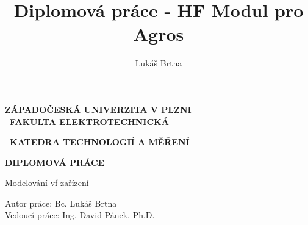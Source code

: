 \documentclass[12pt,a4paper,oneside]{article}
\author{Lukáš Brtna}
\title{Diplomová práce - HF Modul pro Agros}
\numberwithin{equation}{section} %
\numberwithin{figure}{section} %
\numberwithin{table}{section} %
\newcommand{\tg}{\mathrm{tg}\ }
\newcommand{\grad}{\mathrm{grad}\ }
\newcommand{\rot}{\mathrm{rot}\ }
\renewcommand{\div}{\mathrm{div}\ }
\begin{document}
\renewcommand\refname{Použitá literatura} %
\newcommand{\cotg}{\mathop{\rm cotg}\nolimits} %
\newcommand{\udiv}{\mathop{\rm div}\nolimits} %
\newcommand{\ud}{\mathrm{d}} %



\pagestyle{empty} %


\begin{titlepage} 
\begin{center}

\begin{large}
\textbf{ZÁPADOČESKÁ UNIVERZITA V PLZNI\\
~FAKULTA ELEKTROTECHNICKÁ\\
\vspace*{5mm}}
\end{large}
\textbf{~KATEDRA TECHNOLOGIÍ A MĚŘENÍ}
\vspace{70mm}\\

\begin{Huge}
\textbf{DIPLOMOVÁ PRÁCE}
\vspace{8mm}\\
\end{Huge}
\begin{LARGE}
Modelování vf zařízení \vspace{90mm}\\
\end{LARGE}
\end{center}

\begin{flushleft}
\begin{large}
Autor práce: Bc. Lukáš Brtna\\
\vspace{3mm}
Vedoucí práce: Ing. David Pánek, Ph.D.
\end{large}
\end{flushleft}
\end{titlepage}
\newpage
\end{document}
